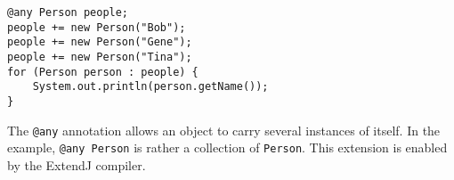 \begin{listing}
    \centering
    \begin{verbatim}
@any Person people;
people += new Person("Bob");
people += new Person("Gene");
people += new Person("Tina");
for (Person person : people) {
    System.out.println(person.getName());
}
    \end{verbatim}
    \caption{
        The \texttt{@any} annotation allows an object to carry several instances of itself.
        In the example, \texttt{@any Person} is rather a collection of \texttt{Person}.
        This extension is enabled by the ExtendJ compiler.
    }
    \label{lst:jastadd-annotation-declaration}
\end{listing}